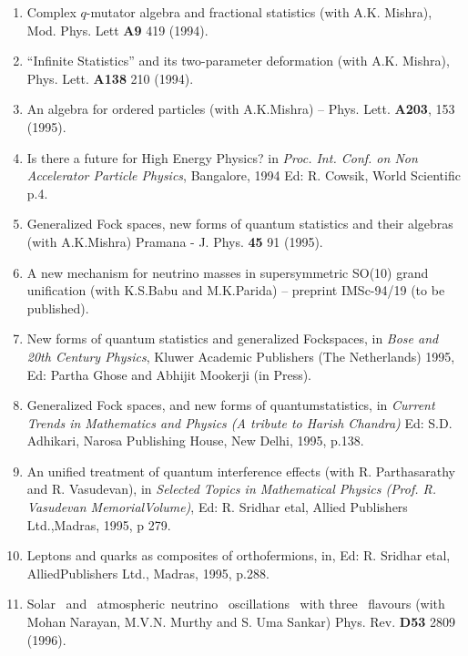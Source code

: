 \begin{enumerate}
\item Complex $q$-mutator algebra and fractional statistics
(with A.K. Mishra), Mod. Phys. Lett {\bf A9} 419 (1994).

\item ``Infinite Statistics'' and its two-parameter deformation
(with A.K. Mishra), Phys. Lett. {\bf A138} 210 (1994).

\item An algebra for ordered particles (with A.K.Mishra) --
Phys. Lett. {\bf A203}, 153 (1995).

\item Is there a future for High Energy Physics? in {\it Proc. Int.
Conf. on Non Accelerator Particle Physics}, Bangalore, 1994 Ed: R.
Cowsik, World Scientific p.4.

\item Generalized Fock spaces, new forms of quantum statistics and
their algebras (with A.K.Mishra) Pramana - J. Phys. {\bf 45} 91 (1995).

\item A new mechanism for neutrino masses in supersymmetric SO(10)
grand unification (with K.S.Babu and M.K.Parida) -- preprint IMSc-94/19
(to be published).

\item New forms of quantum statistics and generalized Fock\break spaces, 
in {\it Bose and 20th Century Physics}, Kluwer Academic Publishers (The
Netherlands) 1995, Ed: Partha Ghose and Abhijit Mookerji (in Press).

\item Generalized Fock spaces, and new forms of quantum\break statistics, in
{\it Current Trends  in Mathematics and Physics
(A tribute to Harish Chandra)} Ed: S.D. Adhikari, 
Narosa Publishing House, New Delhi, 1995, p.138. 

\item An unified treatment of quantum interference effects (with R.
Parthasarathy and R. Vasudevan), in {\it Selected Topics in Mathematical
Physics (Prof. R. Vasudevan Memorial\break Volume)}, Ed: R. Sridhar etal, 
Allied Publishers Ltd.,\break Madras, 1995, p 279.

\item Leptons and quarks as composites of orthofermions, in, Ed: R. Sridhar etal, Allied\break Publishers Ltd., Madras, 1995, 
p.288.

\item Solar \ and \ atmospheric\ neutrino \ oscillations \ with
three \ flavours (with Mohan Narayan, M.V.N. Murthy and S. Uma Sankar)
Phys. Rev. {\bf D53} 2809 (1996).


\end{enumerate}

